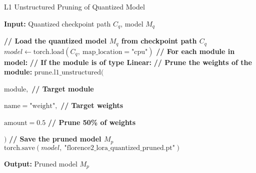 \begin{algorithm}
\caption{L1 Unstructured Pruning of Quantized Model}
\label{alg:l1_pruning}
\noindent\textbf{Input:} Quantized checkpoint path $C_q$, model $M_q$
\begin{algorithmic}[1]
\State \textbf{// Load the quantized model $M_q$ from checkpoint path $C_q$}
\State $model \gets \text{torch.load}(C_q,\ \text{map\_location} = \text{"cpu"})$
\State \textbf{// For each module in model:}
    \State \textbf{// If the module is of type Linear:}
        \State \textbf{// Prune the weights of the module:}
        \State $\text{prune.l1\_unstructured}( $
        
        \hspace{2em}$\text{module},$ \textbf{// Target module}
        
        \hspace{2em}$\text{name} = \text{"weight"},$ \textbf{// Target weights}
        
        \hspace{2em}$\text{amount} = 0.5$ \textbf{// Prune 50\% of weights}
        
        $)$
    \EndIf
\EndFor
\State \textbf{// Save the pruned model $M_p$}
\State $\text{torch.save}(model,\ \text{"florence2\_lora\_quantized\_pruned.pt"})$
\end{algorithmic}
\noindent\textbf{Output:} Pruned model $M_p$
\end{algorithm}
